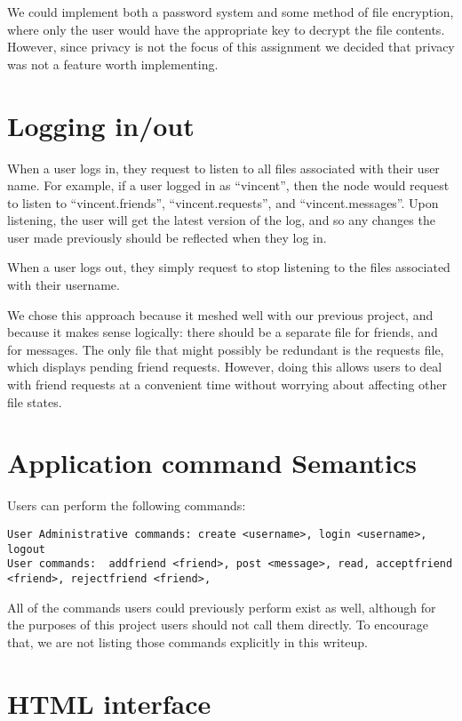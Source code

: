 \documentclass[11pt]{article}
\begin{document}
We could implement both a password system and some method of file encryption, where only the user would have the appropriate key to decrypt the file contents. However, since privacy is not the focus of this assignment we decided that privacy was not a feature worth implementing. 

\section{Logging in/out}

When a user logs in, they request to listen to all files associated with their user name. For example, if a user logged in as ``vincent'', then the node would request to listen to ``vincent.friends'', ``vincent.requests'', and ``vincent.messages''. Upon listening, the user will get the latest version of the log, and so any changes the user made previously should be reflected when they log in. 

When a user logs out, they simply request to stop listening to the files associated with their username. 

We chose this approach because it meshed well with our previous project, and because it makes sense logically: there should be a separate file for friends, and for messages. The only file that might possibly be redundant is the requests file, which displays pending friend requests. However, doing this allows users to deal with friend requests at a convenient time without worrying about affecting other file states.

\section{Application command Semantics}

Users can perform the following commands:
\begin{verbatim}
User Administrative commands: create <username>, login <username>, logout
User commands:  addfriend <friend>, post <message>, read, acceptfriend <friend>, rejectfriend <friend>,
\end{verbatim}

All of the commands users could previously perform exist as well, although for the purposes of this project users should not call them directly. To encourage that, we are not listing those commands explicitly in this writeup.

\section{HTML interface}
\end{document}
